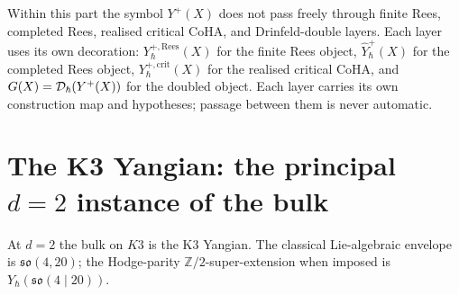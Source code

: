 \begin{remark}
\label{rem:bulk-layer-aware-notation}
Within this part the symbol $Y^{+}(X)$ does not pass freely through
finite Rees, completed Rees, realised critical CoHA, and
Drinfeld-double layers. Each layer uses its own decoration:
$Y^{+,\mathrm{Rees}}_{\hbar}(X)$ for the finite Rees object,
$\widehat Y^{+}_{\hbar}(X)$ for the completed Rees object,
$Y^{+,\mathrm{crit}}_{\hbar}(X)$ for the realised critical CoHA, and
$G(X) = \mathcal D_{\hbar}(Y^{+}(X))$ for the doubled object.
Each layer carries its own construction map and hypotheses; passage
between them is never automatic.
\end{remark}

\section{The K3 Yangian: the principal $d = 2$ instance of the bulk}
\label{sec:bulk-k3-yangian-principal}

At $d = 2$ the bulk on $K3$ is the K3 Yangian. The classical
Lie-algebraic envelope is $\mathfrak{so}(4, 20)$; the
Hodge-parity $\mathbb Z/2$-super-extension when imposed is
$Y_{\hbar}(\mathfrak{so}(4 \mid 20))$.


